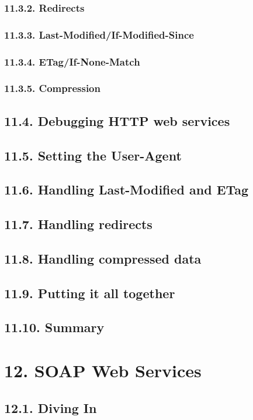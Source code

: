 \documentclass[oneside,12pt]{book}
\begin{document}
\subsection{11.3.2. Redirects}
\subsection{11.3.3. Last-Modified/If-Modified-Since}
\subsection{11.3.4. ETag/If-None-Match}
\subsection{11.3.5. Compression}
       
\section{11.4. Debugging HTTP web services}
\section{11.5. Setting the User-Agent}
\section{11.6. Handling Last-Modified and ETag}
\section{11.7. Handling redirects}
\section{11.8. Handling compressed data}
\section{11.9. Putting it all together}
\section{11.10. Summary}
   
\chapter{12. SOAP Web Services}
\section{12.1. Diving In}
\end{document}
